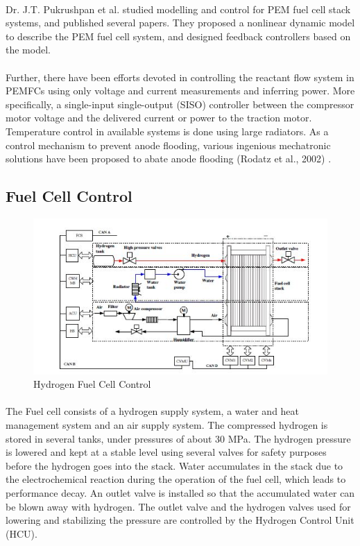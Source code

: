 \paragraph{}Dr. J.T. Pukrushpan et al.\cite{pukrushpan_modeling_2003} studied modelling and control for PEM fuel cell stack
systems, and published several papers. They proposed a nonlinear dynamic model to describe
the PEM fuel cell system, and designed feedback controllers based on the model.
\paragraph{}Further, there have been efforts devoted in controlling the reactant flow system in PEMFCs using only voltage and current measurements and inferring power. More specifically, a single-input
single-output (SISO) controller between the compressor motor voltage and the delivered current or power to the traction motor. Temperature control in available systems is done using large radiators. As a control mechanism to prevent anode flooding, various ingenious mechatronic solutions have been proposed to abate anode flooding (Rodatz et al., 2002)
 \cite{stefanopoulou_mechatronics_nodate}.
\subsection{Fuel Cell Control}
\begin{figure}[!h]
\includegraphics{Figures/Figure7}
\caption{Hydrogen Fuel Cell Control
\cite{xu_hierarchical_2010}}
\end{figure}
\paragraph{}The Fuel cell consists of a hydrogen supply system, a water and heat management system and an air supply system. The compressed hydrogen is stored in several tanks, under  pressures of about 30 MPa. The hydrogen pressure is lowered and kept at a stable level using several valves for safety purposes before the hydrogen goes into the stack. Water accumulates in the stack due to the electrochemical reaction during the operation of the fuel cell, which leads to performance decay. An outlet valve is installed so that the accumulated water can be blown away with hydrogen. The outlet valve and the hydrogen valves used for lowering and stabilizing the pressure are controlled by the Hydrogen Control Unit (HCU).
